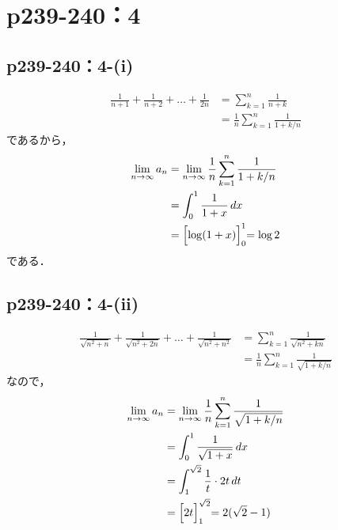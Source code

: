 \documentclass[a4paper,10pt,fleqn]{ltjsarticle}
\begin{document}
\section*{p239-240：4}


\subsection*{p239-240：4-(i)}

\begin{tleftbar}
    \begin{align*} 
        \frac{1}{n+1}+ \frac{1}{n+2}+\dots + \frac{1}{2n} & = \sum_{k=1}^{n} \frac{1}{n+k} \\
        & = \frac{1}{n} \sum_{k=1}^{n} \frac{1}{1+k/n} 
    \end{align*}
    であるから，
    \begin{align*} 
        \lim_{n \to \infty} a_n &= \lim_{n \to \infty} \frac{1}{n} \sum_{k=1}^{n} \frac{1}{1+k/n} \\
        & = \int_{0}^{1} \frac{1}{1+x} \, dx \\
        & = \Bigl [ \log (1+x) \Bigl]_{0}^{1} = \log 2
    \end{align*}
    である．
\end{tleftbar}



\subsection*{p239-240：4-(ii)}

\begin{tleftbar}
    \begin{align*} 
        \frac{1}{\sqrt{n^2+n}}+\frac{1}{\sqrt{n^2+2n}}+\dots+\frac{1}{\sqrt{n^2+n^2}}& = \sum_{k=1}^{n} \frac{1}{\sqrt{n^2+kn}} \\
        & = \frac{1}{n} \sum_{k=1}^{n} \frac{1}{\sqrt{1+k/n}}
    \end{align*}
    なので，
    \begin{align*} 
        \lim_{n \to \infty} a_n &= \lim_{n \to \infty} \frac{1}{n} \sum_{k=1}^{n} \frac{1}{\sqrt{1+k/n}} \\
        & =\int_{0}^{1} \frac{1}{\sqrt{1+x}} \, dx \\
        & =\int_{1}^{\sqrt{2}} \frac{1}{t} \cdot 2t \, dt \\
        & = \Bigl[2t \Bigl ]_{1}^{\sqrt{2}} =2(\sqrt{2}-1)
    \end{align*}
\end{tleftbar}
\end{document}

